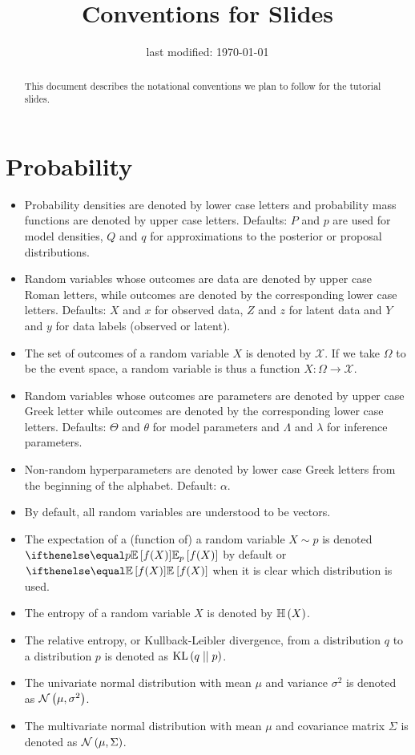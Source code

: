 \documentclass[14pt,a4paper]{article}
\author{}
\title{Conventions for Slides}
\date{last modified: \today}
\begin{document}
\begin{abstract}
This document describes the notational conventions we plan to follow for the tutorial slides. 
\end{abstract}

\section{Probability}
\begin{itemize}
\item Probability densities are denoted by lower case letters and probability mass functions are denoted by upper case letters. Defaults: $ P $ and $ p $ are used for model densities, $ Q $ and $ q $ for approximations to the
posterior or proposal distributions.
\item Random variables whose outcomes are data are denoted by upper case Roman letters, while outcomes are denoted by the corresponding lower case letters. Defaults: $ X $ and $ x $ for observed data, $ Z $ and $ z $
for latent data and $ Y $ and $ y $ for data labels (observed or latent).
\item The set of outcomes of a random variable $ X $ is denoted by $ \mathcal{X} $. If we take $ \Omega $
to be the event space, a random variable is thus a function $ X : \Omega \rightarrow \mathcal{X} $.
\item Random variables whose outcomes are parameters are denoted by upper case Greek letter while outcomes
are denoted by the corresponding lower case letters. Defaults: $ \Theta $ and $ \theta $ for model parameters
and $ \Lambda $ and $ \lambda $ for inference parameters.
\item Non-random hyperparameters are denoted by lower case Greek letters from the beginning of the alphabet.
Default: $ \alpha $.
\item By default, all random variables are understood to be vectors.
\item The expectation of a (function of) a random variable $ X \sim p $ is denoted $ \E[p]{f(X)} $ by default
or $ \E{f(X)} $ when it is clear which distribution is used.
\item The entropy of a random variable $ X $ is denoted by $ \mathbb{H}\left(X\right) $.
\item The relative entropy, or Kullback-Leibler divergence, from a distribution $ q $ to a distribution $ p $ 
is denoted as $ \operatorname{KL}\left(q\mid\mid p\right) $.
\item The univariate normal distribution with mean $ \mu $ and variance $ \sigma^{2} $ is denoted as 
$ \mathcal{N}\left(\mu,\sigma^{2}\right) $.
\item The multivariate normal distribution with mean $ \mu $ and covariance matrix $ \Sigma $ is denoted as
$ \mathcal{N}\left(\mu,\Sigma\right) $.
\end{itemize}
\end{document}

